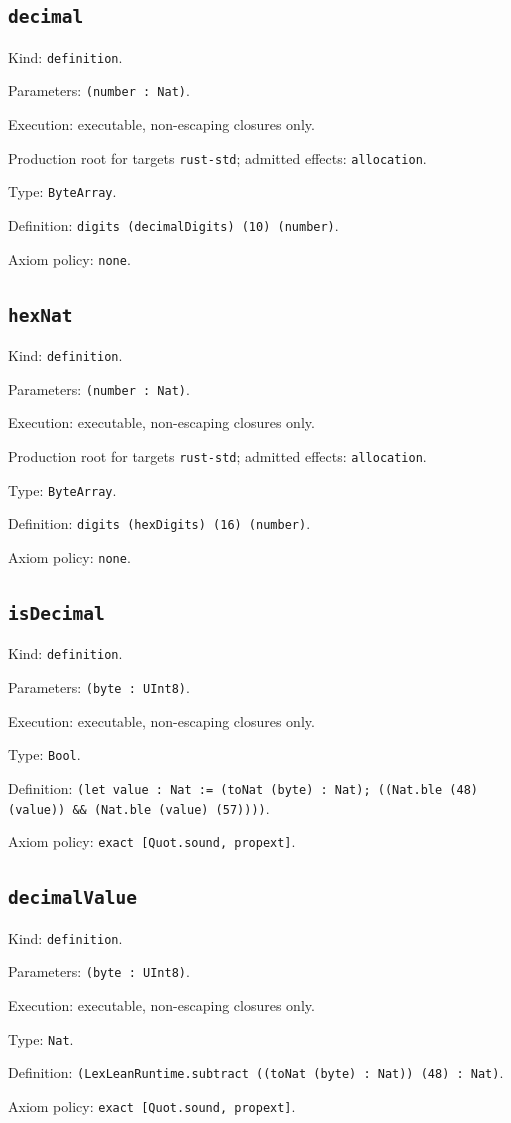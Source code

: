 \documentclass[11pt]{article}
\begin{document}
\subsection*{\texttt{decimal}}
\noindent Kind: \texttt{definition}.\par
\noindent Parameters: \texttt{(number : Nat)}.\par
\noindent Execution: executable, non-escaping closures only.\par
\noindent Production root for targets \texttt{rust-std}; admitted effects: \texttt{allocation}.\par
\noindent Type: \texttt{ByteArray}.\par
\noindent Definition: \texttt{digits (decimalDigits) (10) (number)}.\par
\noindent Axiom policy: \texttt{none}.\par
\subsection*{\texttt{hexNat}}
\noindent Kind: \texttt{definition}.\par
\noindent Parameters: \texttt{(number : Nat)}.\par
\noindent Execution: executable, non-escaping closures only.\par
\noindent Production root for targets \texttt{rust-std}; admitted effects: \texttt{allocation}.\par
\noindent Type: \texttt{ByteArray}.\par
\noindent Definition: \texttt{digits (hexDigits) (16) (number)}.\par
\noindent Axiom policy: \texttt{none}.\par
\subsection*{\texttt{isDecimal}}
\noindent Kind: \texttt{definition}.\par
\noindent Parameters: \texttt{(byte : UInt8)}.\par
\noindent Execution: executable, non-escaping closures only.\par
\noindent Type: \texttt{Bool}.\par
\noindent Definition: \texttt{(let value : Nat := (toNat (byte) : Nat); ((Nat.ble (48) (value)) \&\& (Nat.ble (value) (57))))}.\par
\noindent Axiom policy: \texttt{exact [Quot.sound, propext]}.\par
\subsection*{\texttt{decimalValue}}
\noindent Kind: \texttt{definition}.\par
\noindent Parameters: \texttt{(byte : UInt8)}.\par
\noindent Execution: executable, non-escaping closures only.\par
\noindent Type: \texttt{Nat}.\par
\noindent Definition: \texttt{(LexLeanRuntime.subtract ((toNat (byte) : Nat)) (48) : Nat)}.\par
\noindent Axiom policy: \texttt{exact [Quot.sound, propext]}.\par
\end{document}
